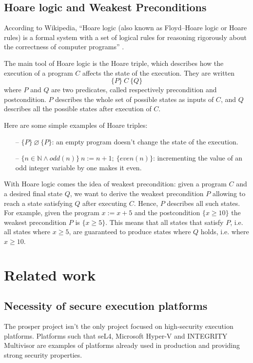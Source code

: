 \documentclass{kththesis}
\begin{document}
\subsection{Hoare logic and Weakest Preconditions}

According to Wikipedia, ``Hoare logic (also known as Floyd–Hoare logic or Hoare rules) is a formal system with a set of logical rules for reasoning rigorously about the correctness of computer programs'' \cite{noauthor_hoare_2019}.

The main tool of Hoare logic is the Hoare triple, which describes how the execution of a program $C$ affects the state of the execution. They are written $$\{P\}~C~\{Q\}$$ where $P$ and $Q$ are two predicates, called respectively precondition and postcondition. $P$ describes the whole set of possible states as inputs of $C$, and $Q$ describes all the possible states after execution of $C$.

Here are some simple examples of Hoare triples:
\begin{itemize}
	\item[--] $\{P\}~\varnothing~\{P\}$: an empty program doesn't change the
	      state of the execution.
	\item[--] $\{n\in \mathbb{N} \land odd(n)\}~n:=n+1;~\{even(n)\}$:
	      incrementing the value of an odd integer variable by one makes it even.
\end{itemize}

With Hoare logic comes the idea of weakest precondition: given a program $C$ and a desired final state $Q$, we want to derive the weakest precondition $P$ allowing to reach a state satisfying $Q$ after executing $C$. Hence, $P$ describes all such states. For example, given the program $x:=x+5$ and the postcondition $\{x \geq 10\}$ the weakest precondition $P$ is $\{x \geq 5\}$. This means that all states that satisfy $P$, i.e. all states where $x \geq 5$, are guaranteed to produce states where $Q$ holds, i.e. where $x \geq 10$.

\section{Related work}

\subsection{Necessity of secure execution platforms}

The \acrshort{prosper} project isn't the only project focused on high-security execution platforms. Platforms such that seL4, Microsoft Hyper-V and INTEGRITY Multivisor are examples of platforms already used in production and providing strong security properties.
\end{document}
